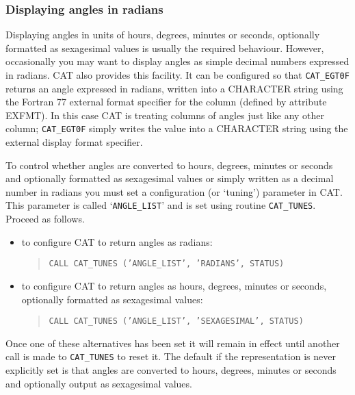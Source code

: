 \subsubsection{Displaying angles in radians}

Displaying angles in units of hours, degrees, minutes or seconds,
optionally formatted as sexagesimal values is usually the required
behaviour. However, occasionally you may want to display angles as
simple decimal numbers expressed in radians. CAT also provides this
facility. It can be configured so that {\tt CAT\_EGT0F} returns an
angle expressed in radians, written into a CHARACTER string using
the Fortran 77 external format specifier for the column (defined by 
attribute EXFMT). In this case CAT is treating columns of angles 
just like any other column; {\tt CAT\_EGT0F} simply writes the 
value into a CHARACTER string using the external display format 
specifier.

To control whether angles are converted to hours, degrees, minutes or
seconds and optionally formatted as sexagesimal values or simply written
as a decimal number in radians you must set a configuration (or
`tuning') parameter in CAT. This parameter is called `{\tt ANGLE\_LIST}'
and is set using routine {\tt CAT\_TUNES}. Proceed as follows.

\begin{itemize}

  \item to configure CAT to return angles as radians:

  \begin{verse}
   {\tt CALL CAT\_TUNES ('ANGLE\_LIST', 'RADIANS', STATUS)}
  \end{verse}

  \item to configure CAT to return angles as hours, degrees, minutes
   or seconds, optionally formatted as sexagesimal values:

  \begin{verse}
   {\tt CALL CAT\_TUNES ('ANGLE\_LIST', 'SEXAGESIMAL', STATUS)} 
  \end{verse}

\end{itemize}

Once one of these alternatives has been set it will remain in 
effect until another call is made to {\tt CAT\_TUNES} to reset 
it. The default if the representation is never explicitly set is 
that angles are converted to hours, degrees, minutes or seconds and
optionally output as sexagesimal values.

